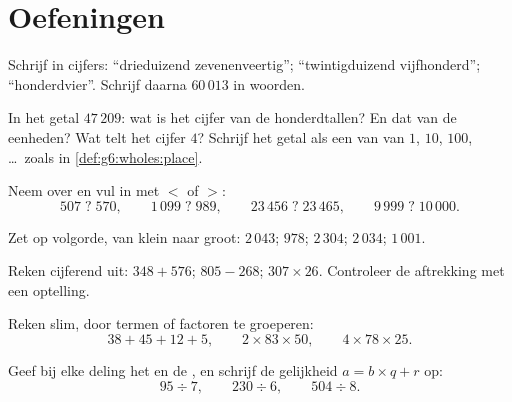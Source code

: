 \section{Oefeningen}

\begin{exercise}[$\star$]\label{exo:g6:wholes:1}
Schrijf in cijfers: ``drieduizend zevenenveertig''; ``twintigduizend
vijfhonderd''; ``honderdvier''. Schrijf daarna $60\,013$ in woorden.
\end{exercise}

\begin{exercise}[$\star$]\label{exo:g6:wholes:2}
In het getal $47\,209$: wat is het cijfer van de honderdtallen? En dat van de
eenheden? Wat telt het cijfer $4$? Schrijf het getal als een  van
 van $1$, $10$, $100$, \dots\ zoals in
\cref{def:g6:wholes:place}.
\end{exercise}

\begin{exercise}[$\star$]\label{exo:g6:wholes:3}
Neem over en vul in met $<$ of $>$:
\[
507 \;?\; 570, \qquad
1\,099 \;?\; 989, \qquad
23\,456 \;?\; 23\,465, \qquad
9\,999 \;?\; 10\,000 .
\]
\end{exercise}

\begin{exercise}[$\star$]\label{exo:g6:wholes:4}
Zet op volgorde, van klein naar groot: $2\,043$; $978$; $2\,304$; $2\,034$;
$1\,001$.
\end{exercise}

\begin{exercise}[$\star$]\label{exo:g6:wholes:5}
Reken cijferend uit: $348 + 576$; \quad $805 - 268$; \quad
$307 \times 26$. Controleer de aftrekking met een optelling.
\end{exercise}

\begin{exercise}[$\star$]\label{exo:g6:wholes:6}
Reken slim, door termen of factoren te groeperen:
\[
38 + 45 + 12 + 5, \qquad
2 \times 83 \times 50, \qquad
4 \times 78 \times 25 .
\]
\end{exercise}

\begin{exercise}[$\star$]\label{exo:g6:wholes:7}
Geef bij elke deling het  en de , en schrijf de gelijkheid
$a = b \times q + r$ op:
\[
95 \div 7, \qquad
230 \div 6, \qquad
504 \div 8 .
\]
\end{exercise}

